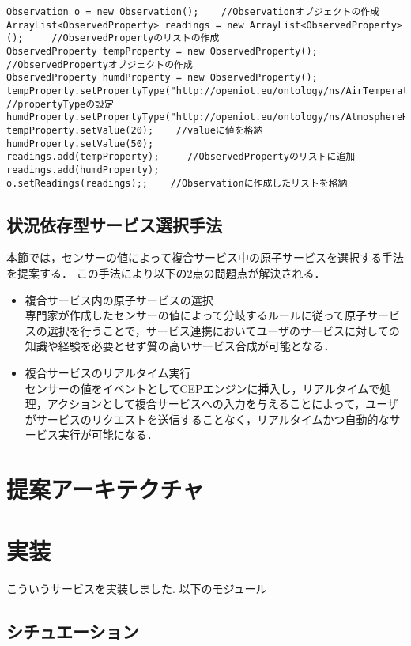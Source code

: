 \documentclass{kuisthesis}			%
\begin{document}
\begin{lstlisting}
Observation o = new Observation();    //Observationオブジェクトの作成
ArrayList<ObservedProperty> readings = new ArrayList<ObservedProperty>();     //ObservedPropertyのリストの作成
ObservedProperty tempProperty = new ObservedProperty();    //ObservedPropertyオブジェクトの作成
ObservedProperty humdProperty = new ObservedProperty();    
tempProperty.setPropertyType("http://openiot.eu/ontology/ns/AirTemperature");    　//propertyTypeの設定
humdProperty.setPropertyType("http://openiot.eu/ontology/ns/AtmosphereHumidity");
tempProperty.setValue(20);    //valueに値を格納
humdProperty.setValue(50);
readings.add(tempProperty);     //ObservedPropertyのリストに追加
readings.add(humdProperty);
o.setReadings(readings);;    //Observationに作成したリストを格納
\end{lstlisting}


\subsection{状況依存型サービス選択手法}
本節では，センサーの値によって複合サービス中の原子サービスを選択する手法を提案する．
この手法により以下の2点の問題点が解決される．
\begin{itemize}
\item 複合サービス内の原子サービスの選択\\
専門家が作成したセンサーの値によって分岐するルールに従って原子サービスの選択を行うことで，サービス連携においてユーザのサービスに対しての知識や経験を必要とせず質の高いサービス合成が可能となる．

\item 複合サービスのリアルタイム実行\\
センサーの値をイベントとしてCEPエンジンに挿入し，リアルタイムで処理，アクションとして複合サービスへの入力を与えることによって，ユーザがサービスのリクエストを送信することなく，リアルタイムかつ自動的なサービス実行が可能になる．
\end{itemize}

\section{提案アーキテクチャ}
\section{実装}
こういうサービスを実装しました.
以下のモジュール
\subsection{シチュエーション}
\end{document}
